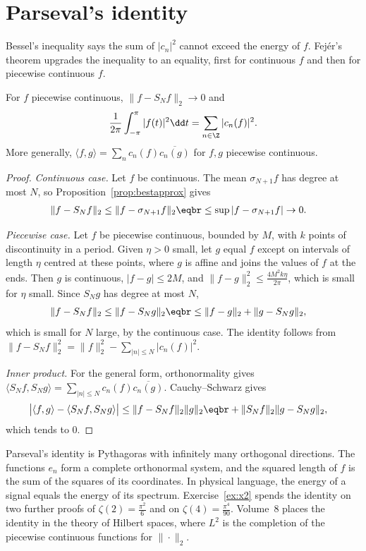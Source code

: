 \section{Parseval's identity}

Bessel's inequality says the sum of $|c_n|^2$ cannot exceed the energy of $f$. Fej\'er's theorem upgrades the inequality to an equality, first for continuous $f$ and then for piecewise continuous $f$.

\begin{theorem}[Parseval]\label{thm:parseval}
For $f$ piecewise continuous, $\|f-S_Nf\|_2\to0$ and
\[
\frac1{2\pi}\int_{-\pi}^\pi|f(t)|^2\dd t=\sum_{n\in\Z}|c_n(f)|^2.
\]
More generally, $\langle f,g\rangle=\sum_nc_n(f)\overline{c_n(g)}$ for $f,g$ piecewise continuous.
\end{theorem}
\begin{proof}
\emph{Continuous case.} Let $f$ be continuous. The mean $\sigma_{N+1}f$ has degree at most $N$, so Proposition~\ref{prop:bestapprox} gives
\[
\begin{aligned}\|f-S_Nf\|_2&\le\|f-\sigma_{N+1}f\|_2\eqbr\le\sup|f-\sigma_{N+1}f|\to0.\end{aligned}
\]

\emph{Piecewise case.} Let $f$ be piecewise continuous, bounded by $M$, with $k$ points of discontinuity in a period. Given $\eta>0$ small, let $g$ equal $f$ except on intervals of length $\eta$ centred at these points, where $g$ is affine and joins the values of $f$ at the ends. Then $g$ is continuous, $|f-g|\le2M$, and $\|f-g\|_2^2\le\frac{4M^2k\eta}{2\pi}$, which is small for $\eta$ small. Since $S_Ng$ has degree at most $N$,
\[
\begin{aligned}\|f-S_Nf\|_2&\le\|f-S_Ng\|_2\eqbr\le\|f-g\|_2+\|g-S_Ng\|_2,\end{aligned}
\]
which is small for $N$ large, by the continuous case. The identity follows from $\|f-S_Nf\|_2^2=\|f\|_2^2-\sum_{|n|\le N}|c_n(f)|^2$.

\emph{Inner product.} For the general form, orthonormality gives $\langle S_Nf,S_Ng\rangle=\sum_{|n|\le N}c_n(f)\overline{c_n(g)}$. Cauchy--Schwarz gives
\[
\begin{aligned}\bigl|\langle f,g\rangle-\langle S_Nf,S_Ng\rangle\bigr|&\le\|f-S_Nf\|_2\|g\|_2\eqbr+\|S_Nf\|_2\|g-S_Ng\|_2,\end{aligned}
\]
which tends to $0$.
\end{proof}

Parseval's identity is Pythagoras with infinitely many orthogonal directions. The functions $e_n$ form a complete orthonormal system, and the squared length of $f$ is the sum of the squares of its coordinates. In physical language, the energy of a signal equals the energy of its spectrum. Exercise~\ref{ex:x2} spends the identity on two further proofs of $\zeta(2)=\frac{\pi^2}6$ and on $\zeta(4)=\frac{\pi^4}{90}$. Volume~8 places the identity in the theory of Hilbert spaces, where $L^2$ is the completion of the piecewise continuous functions for $\|\cdot\|_2$.

